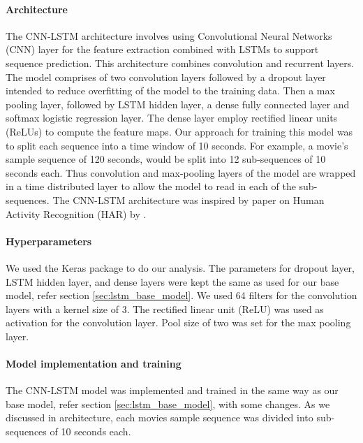 \paragraph{Architecture} The CNN-LSTM architecture involves using Convolutional Neural Networks (CNN) layer for the feature extraction combined with LSTMs to support sequence prediction. This architecture combines convolution and recurrent layers. The model comprises of two convolution layers followed by a dropout layer intended to reduce overfitting of the model to the training data. Then a max pooling layer, followed by LSTM hidden layer, a dense fully connected layer and softmax logistic regression layer. The dense layer employ rectified linear units (ReLUs) to compute the feature maps. Our approach for training this model was to split each sequence into a time window of 10 seconds. For example, a movie's sample sequence of 120 seconds, would be split into 12 sub-sequences of 10 seconds each. Thus convolution and max-pooling layers of the model are wrapped in a time distributed layer to allow the model to read in each of the sub-sequences. The CNN-LSTM architecture was inspired by paper on Human Activity Recognition (HAR) by \citeauthor{ordonez_deep_2016}. 

\paragraph{Hyperparameters} We used the Keras \cite{keras} package to do our analysis. The parameters for dropout layer, LSTM hidden layer, and dense layers were kept the same as used for our base model, refer section \ref{sec:lstm_base_model}. We used 64 filters for the convolution layers with a kernel size of 3. The rectified linear unit (ReLU) was used as activation for the convolution layer. Pool size of two was set for the max pooling layer.

\paragraph{Model implementation and training} The CNN-LSTM model was implemented and trained in the same way as our base model, refer section \ref{sec:lstm_base_model}, with some changes. As we discussed in architecture, each movies sample sequence was divided into sub-sequences of 10 seconds each.

